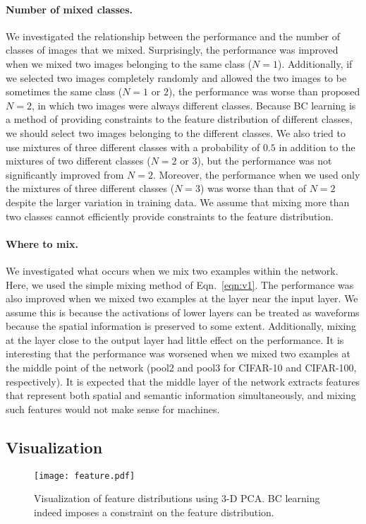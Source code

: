 \documentclass[10pt,twocolumn,letterpaper]{article}
\begin{document}
\paragraph{Number of mixed classes.}
We investigated the relationship between the performance and the number of classes of images that we mixed. Surprisingly, the performance was improved when we mixed two images belonging to the same class ($N=1$). Additionally, if we selected two images completely randomly and allowed the two images to be sometimes the same class ($N=1$ or $2$), the performance was worse than proposed $N=2$, in which two images were always different classes. Because BC learning is a method of providing constraints to the feature distribution of different classes, we should select two images belonging to the different classes. We also tried to use mixtures of three different classes with a probability of $0.5$ in addition to the mixtures of two different classes ($N=2$ or $3$), but the performance was not significantly improved from $N=2$. Moreover, the performance when we used only the mixtures of three different classes ($N=3$) was worse than that of $N=2$ despite the larger variation in training data. We assume that mixing more than two classes cannot efficiently provide constraints to the feature distribution.

\paragraph{Where to mix.}
We investigated what occurs when we mix two examples within the network. Here, we used the simple mixing method of Eqn.~\ref{eqn:v1}. The performance was also improved when we mixed two examples at the layer near the input layer. We assume this is because the activations of lower layers can be treated as waveforms because the spatial information is preserved to some extent. Additionally, mixing at the layer close to the output layer had little effect on the performance. It is interesting that the performance was worsened when we mixed two examples at the middle point of the network (pool2 and pool3 for CIFAR-10 and CIFAR-100, respectively). It is expected that the middle layer of the network extracts features that represent both spatial and semantic information simultaneously, and mixing such features would not make sense for machines.

\subsection{Visualization}
\begin{figure}
	\centering
	\vspace{-3mm}
	\texttt{[image: feature.pdf]}
	\vspace{-1mm}
	\caption{Visualization of feature distributions using $3$-D PCA. BC learning indeed imposes a constraint on the feature distribution.}
	\label{fig:feature}
	\vspace{-3mm}
\end{figure}
\end{document}
